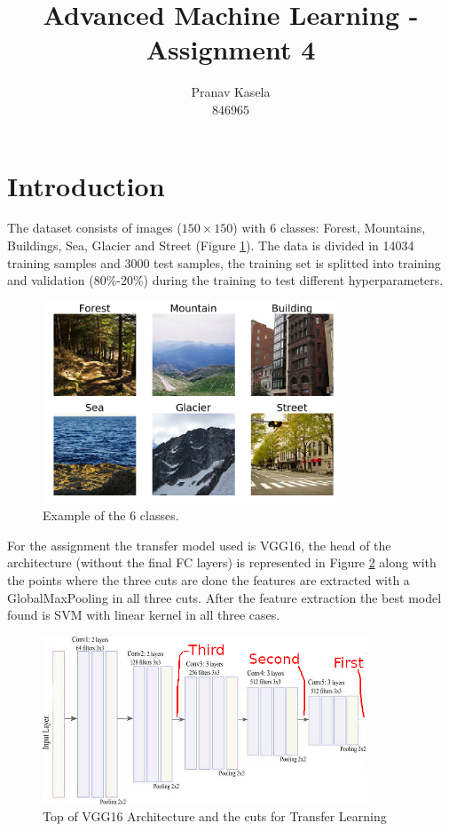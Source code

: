 \documentclass[11pt]{article}
\title{Advanced Machine Learning - Assignment 4}
\author{Pranav Kasela \\$846965$}
\date{}
\begin{document}
\maketitle

\section*{Introduction}
The dataset consists of images ($150\times150$) with 6 classes: Forest, Mountains, Buildings, Sea, Glacier and Street (Figure \ref{fig:example}). The data is divided in 14034 training samples and 3000 test samples, the training set is splitted into training and validation (80\%-20\%) during the training to test different hyperparameters.
\begin{figure}[!h]
  \centering
  \includegraphics[width=\linewidth, height=6cm]{imgs/samples.png}
  \caption{Example of the 6 classes.}
  \label{fig:example}
\end{figure}

For the assignment the transfer model used is VGG16, the head of the architecture (without the final FC layers) is represented in Figure \ref{fig:VGG16} along with the points where the three cuts are done the features are extracted with a GlobalMaxPooling in all three cuts.
After the feature extraction the best model found is SVM with linear kernel in all three cases.
\begin{figure}[!h]
  \centering
  \includegraphics[width=\linewidth, height=5cm]{imgs/VGG16.png}
  \caption{Top of VGG16 Architecture and the cuts for Transfer Learning}
  \label{fig:VGG16}
\end{figure}
\end{document}
